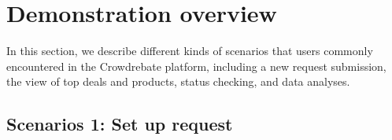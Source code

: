 \section{Demonstration overview}

In this section, we describe different kinds of scenarios that users commonly encountered in the Crowdrebate platform, including a new request submission, the view of top deals and products, status checking, and data analyses.

\subsection{Scenarios 1: Set up request}

\begin{figure}[t!] \vspace{-2ex}
\end{figure}
